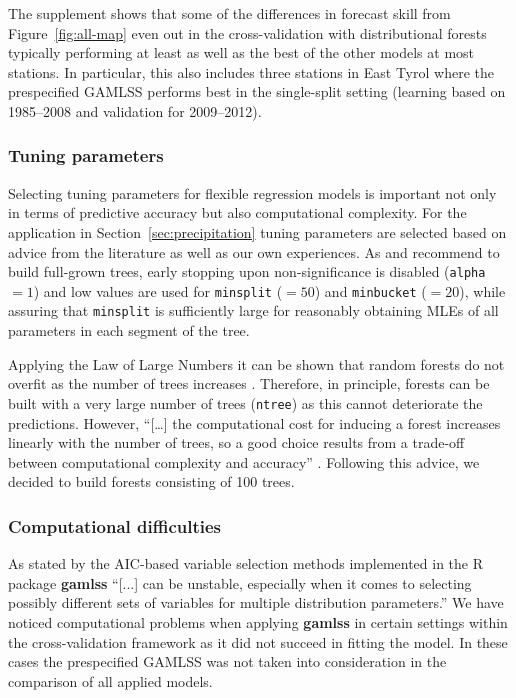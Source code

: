 \documentclass[aoas, preprint]{imsart}
\numberwithin{equation}{subsection}
\begin{document}
The supplement shows that some of the differences in forecast skill from
Figure~\ref{fig:all-map} even out in the cross-validation with distributional
forests typically performing at least as well as the best of the other models at most
stations. In particular, this also includes three stations in East Tyrol
where the prespecified GAMLSS performs best in the single-split setting
(learning based on 1985--2008 and validation for 2009--2012). 


\subsubsection*{Tuning parameters}

Selecting tuning parameters for flexible regression models is important
not only in terms of predictive accuracy but also computational complexity. 
For the application in Section~\ref{sec:precipitation} tuning parameters
are selected based on advice from the literature as well as our own experiences.
As \cite{Hastie+Tibshirani+Friedman:2001} and \cite{Breiman:2001} recommend to 
build full-grown trees, early stopping upon non-significance is disabled
(\texttt{alpha} $= 1$) and low values are used for \texttt{minsplit} ($ = 50$)
and \texttt{minbucket} ($ = 20$), while assuring that \texttt{minsplit}
is sufficiently large for reasonably obtaining MLEs of all parameters in each
segment of the tree.

Applying the Law of Large Numbers it can be shown that random forests do not overfit 
as the number of trees increases
\citep{Breiman:2001,Hastie+Tibshirani+Friedman:2001,Biau+Scornet:2016}.
Therefore, in principle, forests can be built with a very large number of trees
(\texttt{ntree}) as this cannot deteriorate the predictions. However, ``[\dots] the
computational cost for inducing a forest increases linearly with the number of trees,
so a good choice results from a trade-off between computational complexity and accuracy''
\citep[][p.~205]{Biau+Scornet:2016}.
Following this advice, we decided to build forests consisting of 100 trees.


\subsubsection*{Computational difficulties}

As stated by \cite{Hofner+Mayr+Schmid:2016} the AIC-based variable selection 
methods implemented in the \textsf{R} package \textbf{gamlss} ``[...] can be 
unstable, especially when it comes to selecting possibly different sets of variables for 
multiple distribution parameters.'' We have noticed computational problems when
applying \textbf{gamlss} in certain settings within the cross-validation
framework as it did not succeed in fitting the model. In these cases the prespecified
GAMLSS was not taken into consideration in the comparison of all applied models.
\end{document}
